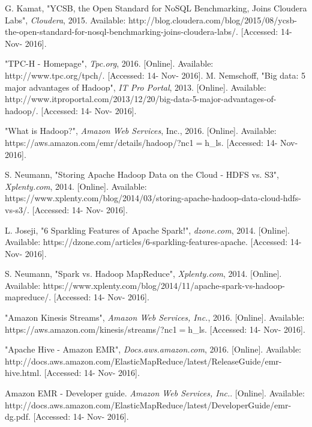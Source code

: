 \documentclass[10pt,draftclsnofoot,onecolumn,journal,compsoc]{IEEEtran}
\begin{document}
    \newpage
     \begin{thebibliography}{1}
        G. Kamat, "YCSB, the Open Standard for NoSQL Benchmarking, Joins Cloudera Labs", \textit{Cloudera}, 2015. Available: http://blog.cloudera.com/blog/2015/08/ycsb-the-open-standard-for-nosql-benchmarking-joins-cloudera-labs/. [Accessed: 14- Nov- 2016].
        
        "TPC-H - Homepage", \textit{Tpc.org}, 2016. [Online]. Available: http://www.tpc.org/tpch/. [Accessed: 14- Nov- 2016].
        M. Nemschoff, "Big data: 5 major advantages of Hadoop", \textit{IT Pro Portal}, 2013. [Online]. Available: http://www.itproportal.com/2013/12/20/big-data-5-major-advantages-of-hadoop/. [Accessed: 14- Nov- 2016].
        
        "What is Hadoop?", \textit{Amazon Web Services}, Inc., 2016. [Online]. Available: https://aws.amazon.com/emr/details/hadoop/?nc1{$=$}h\_ls. [Accessed: 14- Nov- 2016].
        
        S. Neumann, "Storing Apache Hadoop Data on the Cloud - HDFS vs. S3", \textit{Xplenty.com}, 2014. [Online]. Available: https://www.xplenty.com/blog/2014/03/storing-apache-hadoop-data-cloud-hdfs-vs-s3/. [Accessed: 14- Nov- 2016].
        
        L. Joseji, "6 Sparkling Features of Apache Spark!", \textit{dzone.com}, 2014. [Online]. Available: https://dzone.com/articles/6-sparkling-features-apache. [Accessed: 14- Nov- 2016].
        
        S. Neumann, "Spark vs. Hadoop MapReduce", \textit{Xplenty.com}, 2014. [Online]. Available: https://www.xplenty.com/blog/2014/11/apache-spark-vs-hadoop-mapreduce/. [Accessed: 14- Nov- 2016].
        
        "Amazon Kinesis Streams", \textit{Amazon Web Services, Inc.}, 2016. [Online]. Available: https://aws.amazon.com/kinesis/streams/?nc1{$=$}h\_ls. [Accessed: 14- Nov- 2016].
        
        "Apache Hive - Amazon EMR", \textit{Docs.aws.amazon.com}, 2016. [Online]. Available: http://docs.aws.amazon.com/ElasticMapReduce/latest/ReleaseGuide/emr-hive.html. [Accessed: 14- Nov- 2016].
        
        Amazon EMR - Developer guide. \textit{Amazon Web Services, Inc.}. [Online]. Available: http://docs.aws.amazon.com/ElasticMapReduce/latest/DeveloperGuide/emr-dg.pdf. [Accessed: 14- Nov- 2016].
        

\end{thebibliography}
\end{document}
